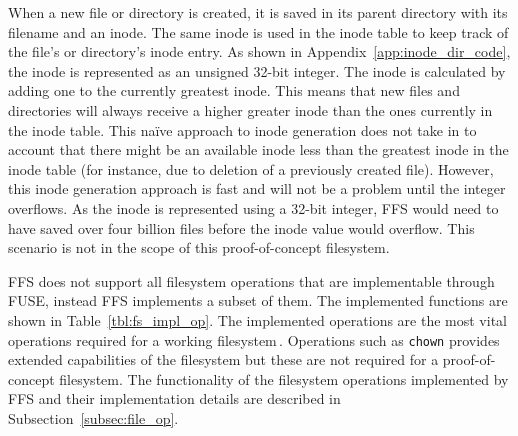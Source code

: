 When a new file or directory is created, it is saved in its parent directory with its filename and an inode. The same inode is used in the inode table to keep track of the file's or directory's inode entry. As shown in Appendix~\ref{app:inode_dir_code}, the inode is represented as an unsigned 32-bit integer. The inode is calculated by adding one to the currently greatest inode. This means that new files and directories will always receive a higher greater inode than the ones currently in the inode table. This naïve approach to inode generation does not take in to account that there might be an available inode less than the greatest inode in the inode table (for instance, due to deletion of a previously created file). However, this inode generation approach is fast and will not be a problem until the integer overflows. As the inode is represented using a 32-bit integer, FFS would need to have saved over four billion files before the inode value would overflow. This scenario is not in the scope of this proof-of-concept filesystem.

FFS does not support all filesystem operations that are implementable through FUSE, instead FFS implements a subset of them. The implemented functions are shown in Table~\ref{tbl:fs_impl_op}. The implemented operations are the most vital operations required for a working filesystem\,\cite{kuenningCS135FUSEDocumentation2010}. Operations such as \texttt{chown} provides extended capabilities of the filesystem but these are not required for a proof-of-concept filesystem. The functionality of the filesystem operations implemented by FFS and their implementation details are described in Subsection~\ref{subsec:file_op}. 

